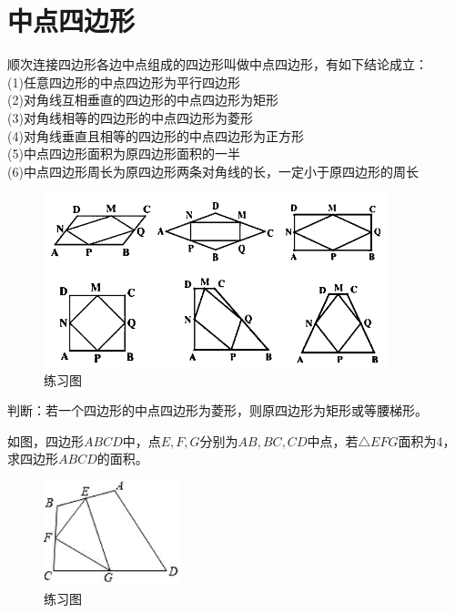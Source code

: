 \documentclass{ecnuthesis}
\begin{document}
\section{中点四边形}
\begin{knowledge}
    顺次连接四边形各边中点组成的四边形叫做中点四边形，有如下结论成立：\\
    (1)任意四边形的中点四边形为平行四边形 \\
    (2)对角线互相垂直的四边形的中点四边形为矩形 \\
    (3)对角线相等的四边形的中点四边形为菱形 \\
    (4)对角线垂直且相等的四边形的中点四边形为正方形 \\
    (5)中点四边形面积为原四边形面积的一半  \\
    (6)中点四边形周长为原四边形两条对角线的长，一定小于原四边形的周长 \\
\end{knowledge}
\begin{figure}[H]
\centering
\includegraphics[width=10cm]{picture/601.png}
\caption{练习图}
\end{figure}
\begin{problem}
    判断：若一个四边形的中点四边形为菱形，则原四边形为矩形或等腰梯形。
\end{problem}
\begin{problem}
    如图，四边形$ABCD$中，点$E,F,G$分别为$AB,BC,CD$中点，若$\triangle EFG$面积为4，求四边形$ABCD$的面积。
\end{problem}
\begin{figure}[H]
\centering
\includegraphics[width=4cm]{picture/602.png}
\caption{练习图}
\end{figure}
\clearpage
\end{document}
